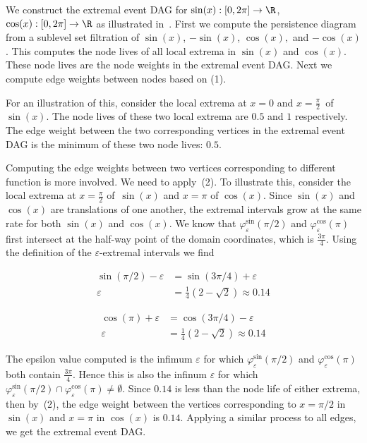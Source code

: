 \begin{example}
    We construct the extremal event DAG for \mbox{$\sin(x):[0,2\pi]\rightarrow \R$},
    $\cos(x):[0,2\pi]\rightarrow \R$ as illustrated in~. First we
    compute the persistence diagram from a sublevel set filtration of
    $\sin(x)$, $-\sin(x)$, $\cos(x),$ and $-\cos(x)$.
    This computes the node lives of all local extrema in $\sin(x)$
    and $\cos(x)$. These node lives are the node weights in the extremal event DAG. Next we
    compute edge weights between nodes based on (1).
    
    For an illustration of this, consider the local extrema at
    $x=0$ and $x=\frac{\pi}{2}$~of~$\sin(x)$. The node lives of these two local
    extrema are $0.5$ and $1$ respectively. The edge weight between the two corresponding
    vertices in the extremal event DAG is the minimum of these two node lives: $0.5$.

    Computing
    the edge weights between two vertices corresponding to different function is more involved.
    We need to apply~(2). To illustrate this, consider the local extrema at
    $x=\frac{\pi}{2}$ of~$\sin(x)$ and $x=\pi$ of $\cos(x)$. Since $\sin(x)$ and
    $\cos(x)$ are translations of one another, the
    extremal intervals grow at the same rate for both $\sin(x)$ and
    $\cos(x)$. We know that $\varphi^{\sin}_{\varepsilon}(\pi/2)$ and $\varphi^{\cos}_{\varepsilon}(\pi)$
    first intersect at the half-way point of the domain coordinates, which is $\frac{3\pi}{4}$.
    Using the definition of the $\varepsilon$-extremal  intervals we find

    \begin{align*}
        \sin(\pi/2)-\varepsilon &= \sin(3\pi/4)+\varepsilon\\
        \varepsilon &= \frac{1}{4}(2-\sqrt{2}) \approx 0.14
    \end{align*}

    \begin{align*}
        \cos(\pi)+\varepsilon &= \cos(3\pi/4)-\varepsilon\\
        \varepsilon &= \frac{1}{4}(2-\sqrt{2}) \approx 0.14
    \end{align*}

    The epsilon value computed is the infimum $\varepsilon$ for which $\varphi^{\sin}_\varepsilon(\pi/2)$
    and $\varphi^{\cos}_\varepsilon(\pi)$ both contain $\frac{3\pi}{4}$. Hence this is also the infinum
    $\varepsilon$ for which $\varphi^{\sin}_\varepsilon(\pi/2)\cap \varphi^{\cos}_\varepsilon(\pi)\neq \emptyset$.
    Since $0.14$ is less than the node life of either extrema, then by~(2), the
    edge weight between the vertices corresponding to $x=\pi/2$
    in $\sin(x)$ and $x=\pi$ in $\cos(x)$ is $0.14$. Applying a similar process to all edges, we get
    the extremal event DAG.


\end{example}
